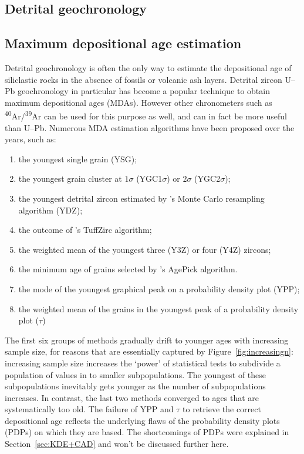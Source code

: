 \begin{refsection}


\chapter{Detrital geochronology}\label{ch:detrital}

\section{Maximum depositional age estimation}

Detrital geochronology is often the only way to estimate the
depositional age of siliclastic rocks in the absence of fossils or
volcanic ash layers. Detrital zircon U--Pb geochronology in particular
has become a popular technique to obtain maximum depositional ages
(MDAs). However other chronometers such as
\textsuperscript{40}Ar/\textsuperscript{39}Ar can be used for this
purpose as well, and can in fact be more useful than U--Pb. Numerous
MDA estimation algorithms have been proposed over the years, such as:

\begin{enumerate}
\item the youngest single grain (YSG);
\item the youngest grain cluster at $1\sigma$ (YGC1$\sigma$) or
  $2\sigma$ (YGC2$\sigma$);
\item the youngest detrital zircon estimated by \citet{ludwig2003}'s
  Monte Carlo resampling algorithm (YDZ);
\item the outcome of \citet{ludwig2002}'s TuffZirc algorithm;
\item the weighted mean of the youngest three (Y3Z) or four (Y4Z)
  zircons;
\item the minimum age of grains selected by \citet{gehrels2003}'s
  AgePick algorithm.
\item the mode of the youngest graphical peak on a probability density
  plot (YPP);
\item the weighted mean of the grains in the youngest peak of a
  probability density plot ($\tau$)
\end{enumerate}

The first six groups of methods gradually drift to younger ages with
increasing sample size, for reasons that are essentially captured by
Figure~\ref{fig:increasingn}: increasing sample size increases the
`power' of statistical tests to subdivide a population of values in to
smaller subpopulations. The youngest of these subpopulations
inevitably gets younger as the number of subpopulations increases.  In
contrast, the last two methods converged to ages that are
systematically too old. The failure of YPP and $\tau$ to retrieve the
correct depositional age reflects the underlying flaws of the
probability density plots (PDPs) on which they are based. The
shortcomings of PDPs were explained in Section~\ref{sec:KDE+CAD} and
won't be discussed further here.\\


\end{refsection}
